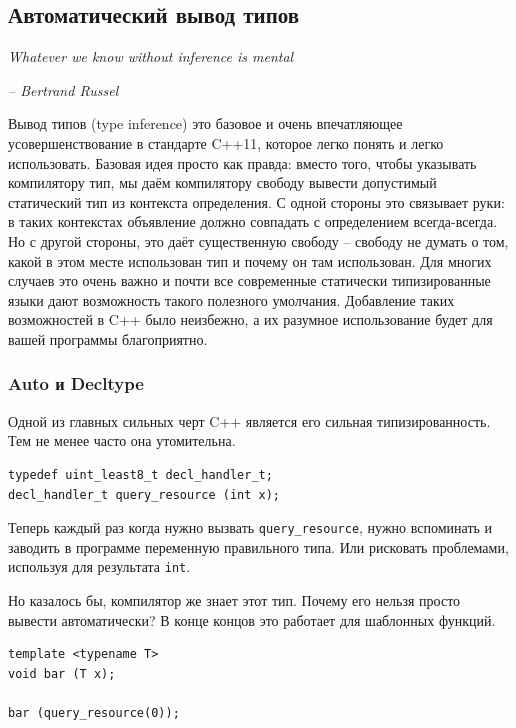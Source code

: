 \documentclass[a4paper,12pt,oneside]{article}
\begin{document}
\pagebreak
\subsection{Автоматический вывод типов}\label{TypeInference}

\hfill\textit{Whatever we know without inference is mental}{\vspace{0.5em}}

\hfill\textit{-- Bertrand Russel}

Вывод типов (type inference) это базовое и очень впечатляющее усовершенствование в стандарте C++11, которое легко понять и легко использовать. Базовая идея просто как правда: вместо того, чтобы указывать компилятору тип, мы даём компилятору свободу вывести допустимый статический тип из контекста определения. С одной стороны это связывает руки: в таких контекстах объявление должно совпадать с определением всегда-всегда. Но с другой стороны, это даёт существенную свободу -- свободу не думать о том, какой в этом месте использован тип и почему он там использован. Для многих случаев это очень важно и почти все современные статически типизированные языки дают возможность такого полезного умолчания. Добавление таких возможностей в C++ было неизбежно, а их разумное использование будет для вашей программы благоприятно.

\subsubsection{Auto и Decltype}\label{DecltypeAuto}

Одной из главных сильных черт C++ является его сильная типизированность. Тем не менее часто она утомительна. 

\begin{lstlisting}
typedef uint_least8_t decl_handler_t;
decl_handler_t query_resource (int x);
\end{lstlisting}

Теперь каждый раз когда нужно вызвать \lstinline!query_resource!, нужно вспоминать и заводить в программе переменную правильного типа. Или рисковать проблемами, используя для результата \lstinline!int!.

Но казалось бы, компилятор же знает этот тип. Почему его нельзя просто вывести автоматически? В конце концов это работает для шаблонных функций.

\begin{lstlisting}
template <typename T> 
void bar (T x);

bar (query_resource(0));
\end{lstlisting}
\end{document}
